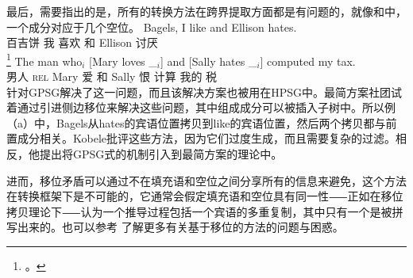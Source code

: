 最后，需要指出的是，所有的转换方法在跨界提取方面都是有问题的，就像和中，一个成分对应于几个空位。
\eal
\label{ex-atb-minimalism}
\ex\label{ex-bagels-i-like-and-ellison-hates}
\gll Bagels, I like and Ellison hates.\\
	百吉饼 我 喜欢 和 Ellison 讨厌\\
\footnote{%
   。
}
\ex 
\gll The          man who$_i$ [Mary loves \_$_i$] and [Sally hates \_$_i$] computed my tax.\\
      男人 \textsc{rel} Mary 爱 {} 和 Sally 恨 {} 计算 我的 税\\
\zl
 \citet{Gazdar81}针对GPSG解决了这一问题，而且该解决方案也被用在HPSG中。最简方案社团试着通过引进侧边移位来解决这些问题\citep{Nunes2004a-u}，其中组成成分可以被插入子树中。所以例（a）中，Bagels从hates的宾语位置拷贝到like的宾语位置，然后两个拷贝都与前置成分相关。Kobele批评这些方法，因为它们过度生成，而且需要复杂的过滤。相反，他提出将GPSG式的\slaschc 机制引入到最简方案的理论中\citep{Kobele2008a}。

进而，移位矛盾\citep[\S~2]{Bresnan2001a}可以通过不在填充语和空位之间分享所有的信息来避免，这个方法在转换框架下是不可能的，它通常会假定填充语和空位具有同一性⸺正如在移位拷贝理论下⸺认为一个推导过程包括一个宾语的多重复制，其中只有一个是被拼写出来的。也可以参考 了解更多有关基于移位的方法的问题与困惑。 


